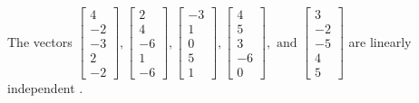 \begin{exercise}
\begin{exerciseStatement}
  \end{exerciseStatement}
  \begin{exerciseAnswer}
   The vectors \(\left[\begin{array}{r}
4 \\
-2 \\
-3 \\
2 \\
-2
\end{array}\right] , \left[\begin{array}{r}
2 \\
4 \\
-6 \\
1 \\
-6
\end{array}\right] , \left[\begin{array}{r}
-3 \\
1 \\
0 \\
5 \\
1
\end{array}\right] , \left[\begin{array}{r}
4 \\
5 \\
3 \\
-6 \\
0
\end{array}\right] , \text{ and } \left[\begin{array}{r}
3 \\
-2 \\
-5 \\
4 \\
5
\end{array}\right]\) are 
  	 linearly independent  .
  


  \end{exerciseAnswer}
\end{exercise}
